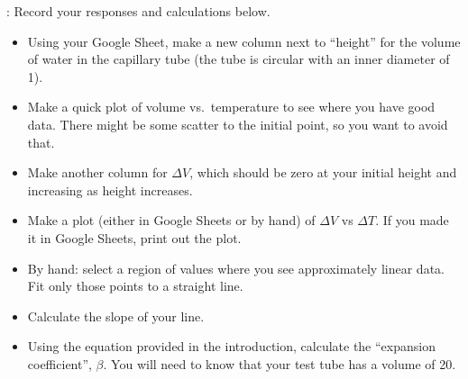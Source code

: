 : Record your responses and calculations below.
	\begin{itemize}
	\item Using your Google Sheet, make a new column next to ``height'' for the volume of water in the capillary tube (the tube is circular with an inner diameter of \unit{1}{\milli\meter}).
	\item Make a quick plot of volume vs.\ temperature to see where you have good data.   There might be some scatter to the initial point, so you want to avoid that. 
	\item Make another column for $\Delta V$, which should be zero at your initial height and increasing as height increases.
	\item Make a plot (either in Google Sheets or by hand) of $\Delta V$ vs $\Delta T$.  If you made it in Google Sheets, print out the plot.
	\item By hand: select a region of values where you see approximately linear data. Fit only those points to a straight line.
	\item Calculate the slope of your line.
	\item Using the equation provided in the introduction, calculate the ``expansion coefficient'', $\beta$.  You will need to know that your test tube has a volume of \unit{20}{\milli\liter}.
	\end{itemize}



 

